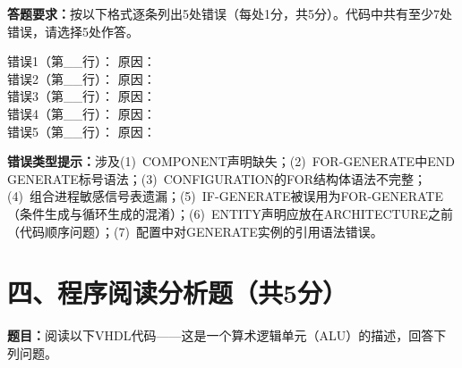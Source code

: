 \vspace{0.3cm}

\begin{framed}
\textbf{答题要求：}按以下格式逐条列出5处错误（每处1分，共5分）。代码中共有至少7处错误，请选择5处作答。

\noindent 错误1（第\_\_行）：\underline{\hspace{3cm}} \quad 原因：\underline{\hspace{5cm}}\\[2pt]
错误2（第\_\_行）：\underline{\hspace{3cm}} \quad 原因：\underline{\hspace{5cm}}\\[2pt]
错误3（第\_\_行）：\underline{\hspace{3cm}} \quad 原因：\underline{\hspace{5cm}}\\[2pt]
错误4（第\_\_行）：\underline{\hspace{3cm}} \quad 原因：\underline{\hspace{5cm}}\\[2pt]
错误5（第\_\_行）：\underline{\hspace{3cm}} \quad 原因：\underline{\hspace{5cm}}

\vspace{0.3cm}
\textbf{错误类型提示：}涉及(1)~COMPONENT声明缺失；(2)~FOR-GENERATE中END GENERATE标号语法；(3)~CONFIGURATION的FOR结构体语法不完整；(4)~组合进程敏感信号表遗漏；(5)~IF-GENERATE被误用为FOR-GENERATE（条件生成与循环生成的混淆）；(6)~ENTITY声明应放在ARCHITECTURE之前（代码顺序问题）；(7)~配置中对GENERATE实例的引用语法错误。
\end{framed}

\newpage

\section*{四、程序阅读分析题（共5分）}

\textbf{题目：}阅读以下VHDL代码——这是一个算术逻辑单元（ALU）的描述，回答下列问题。

\vspace{0.3cm}

